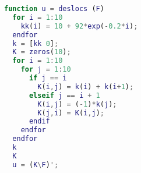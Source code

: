 \documentclass[a4paper, 12pt]{article}
\begin{document}
	\begin{lstlisting}[language=Matlab, caption=Código utilizado para os resultados obtidos]
function u = deslocs (F)
  for i = 1:10
    kk(i) = 10 + 92*exp(-0.2*i);    
  endfor
  k = [kk 0];
  K = zeros(10);
  for i = 1:10
    for j = 1:10
      if j == i
        K(i,j) = k(i) + k(i+1);
      elseif j == i + 1
    	K(i,j) = (-1)*k(j);
    	K(j,i) = K(i,j);
      endif
    endfor
  endfor
  k
  K
  u = (K\F)';
	\end{lstlisting}
	
	
\end{document}
